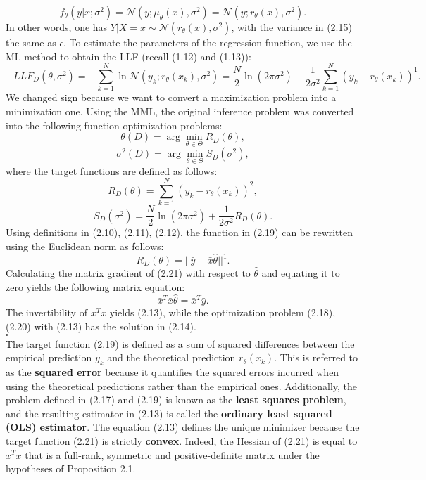 \documentclass{report}
\begin{document}
\begin{equation}
f_\theta(y|x;\sigma^2) = \mathcal{N}(y;\mu_\theta(x),\sigma^2) = \mathcal{N}(y;r_\theta(x),\sigma^2).
\end{equation}
In other words, one has $Y|X=x \sim \mathcal{N}(r_\theta(x), \sigma^2)$, with the variance in (2.15) the same as $\epsilon$. To estimate the parameters of the regression function, we use the ML method to obtain the LLF (recall (1.12) and (1.13)):
\begin{equation}
-LLF_{D}(\theta,\sigma^2)=-\sum_{k=1}^N\ln\mathcal{N}(y_k;r_\theta(x_k),\sigma^2)=\frac{N}{2}\ln(2\pi\sigma^2)+\frac{1}{2\sigma^2}\sum_{k=1}^N(y_k-r_\theta(x_k))^1.
\end{equation}
We changed sign because we want to convert a maximization problem into a minimization one. Using the MML, the original inference problem was converted into the following function optimization problems:
\begin{equation}
 \theta(D) = \arg\min_{\theta \in \Theta} R_{D}(\theta),
\end{equation}
\begin{equation}
 \sigma^2(D) = \arg\min_{\theta \in \Theta} S_{D}(\sigma^2),
\end{equation}
where the target functions are defined as follows:
\begin{equation}
R_{D}(\theta) =\sum_{k=1}^N(y_k-r_\theta(x_k))^2,
\end{equation}
\begin{equation}
S_{D}(\sigma^2) = \frac{N}{2}\ln(2\pi\sigma^2)+\frac{1}{2\sigma^2}R_{D}(\theta).
\end{equation}
Using definitions in (2.10), (2.11), (2.12), the function in (2.19) can be rewritten using the Euclidean norm as follows:
\begin{equation}
R_{D}(\theta) = ||\bar{y} -\bar{x}\hat{\theta}||^1.
\end{equation}
Calculating the matrix gradient of (2.21) with respect to $\hat{\theta}$ and equating it to zero yields the following matrix equation:
\begin{equation}
\bar{x}^T\bar{x}\hat{\theta} = \bar{x}^T\bar{y}.
\end{equation}
The invertibility of $\bar{x}^T\bar{x}$ yields (2.13), while the optimization problem (2.18), (2.20) with (2.13) has the solution in (2.14).\\
$\square$\\
The target function (2.19) is defined as a sum of squared differences between the empirical prediction $y_k$ and the theoretical prediction $r_\theta(x_k)$. This is referred to as the \textbf{squared error} because it quantifies the squared errors incurred when using the theoretical predictions rather than the empirical ones. Additionally, the problem defined in (2.17) and (2.19) is known as the \textbf{least squares problem}, and the resulting estimator in (2.13) is called the \textbf{ordinary least squared (OLS) estimator}. The equation (2.13) defines the unique minimizer because the target function (2.21) is strictly \textbf{convex}. Indeed, the Hessian of (2.21) is equal to $\bar{x}^T\bar{x}$ that is a full-rank, symmetric and positive-definite matrix under the hypotheses of Proposition 2.1.
\end{document}
